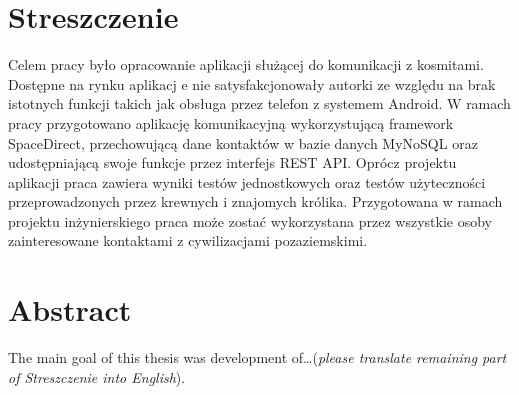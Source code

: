 
\chapter*{Streszczenie} %
Celem pracy było opracowanie aplikacji służącej do komunikacji z kosmitami. Dostępne na rynku aplikacj e nie satysfakcjonowały autorki ze względu na brak istotnych funkcji takich jak obsługa przez telefon z systemem Android.
W ramach pracy przygotowano aplikację komunikacyjną wykorzystującą framework SpaceDirect, przechowującą dane kontaktów w bazie danych MyNoSQL oraz udostępniającą swoje funkcje przez interfejs REST API.
Oprócz projektu aplikacji praca zawiera wyniki testów jednostkowych oraz testów użyteczności przeprowadzonych przez krewnych i znajomych królika.
Przygotowana w ramach projektu inżynierskiego praca może zostać wykorzystana przez wszystkie osoby zainteresowane kontaktami z cywilizacjami pozaziemskimi.


\begingroup
\renewcommand{\cleardoublepage}{}
\renewcommand{\clearpage}{}
\chapter*{Abstract} %
The main goal of this thesis was development of\dots (\textit{please translate remaining part of Streszczenie into English}).
\endgroup
{}
